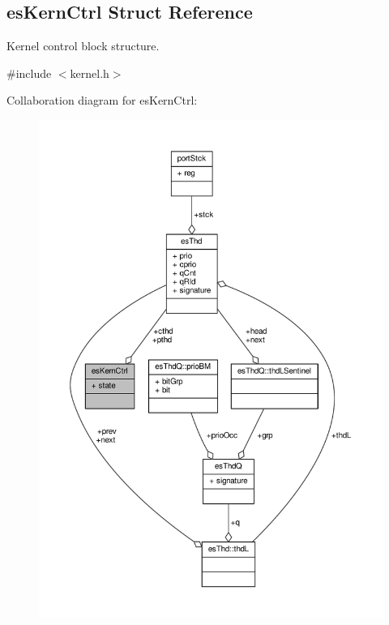 \hypertarget{structesKernCtrl}{\subsection{es\-Kern\-Ctrl Struct Reference}
\label{structesKernCtrl}
}


Kernel control block structure.  




{\ttfamily \#include $<$kernel.\-h$>$}



Collaboration diagram for es\-Kern\-Ctrl\-:\nopagebreak
\begin{figure}[H]
\begin{center}
\leavevmode
\includegraphics[width=350pt]{structesKernCtrl__coll__graph}
\end{center}
\end{figure}
